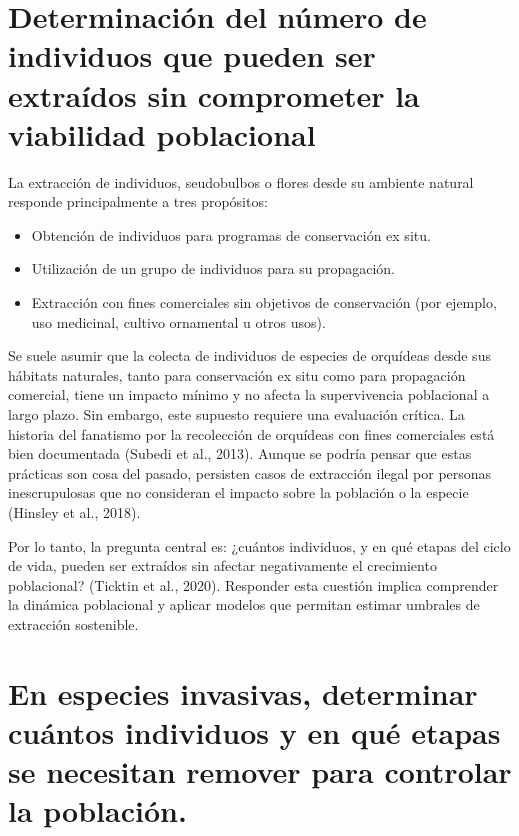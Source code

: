 \documentclass[
  12pt,
  letterpaper,
]{book}
\providecommand{\tightlist}{%
  \setlength{\itemsep}{0pt}\setlength{\parskip}{0pt}}\usepackage{longtable,booktabs,array}
\begin{document}
\section{Determinación del número de individuos que pueden ser extraídos
sin comprometer la viabilidad
poblacional}\label{determinaciuxf3n-del-nuxfamero-de-individuos-que-pueden-ser-extrauxeddos-sin-comprometer-la-viabilidad-poblacional}

La extracción de individuos, seudobulbos o flores desde su ambiente
natural responde principalmente a tres propósitos:

\begin{itemize}
\tightlist
\item
  Obtención de individuos para programas de conservación ex situ.
\item
  Utilización de un grupo de individuos para su propagación.
\item
  Extracción con fines comerciales sin objetivos de conservación (por
  ejemplo, uso medicinal, cultivo ornamental u otros usos).
\end{itemize}

Se suele asumir que la colecta de individuos de especies de orquídeas
desde sus hábitats naturales, tanto para conservación ex situ como para
propagación comercial, tiene un impacto mínimo y no afecta la
supervivencia poblacional a largo plazo. Sin embargo, este supuesto
requiere una evaluación crítica. La historia del fanatismo por la
recolección de orquídeas con fines comerciales está bien documentada
(Subedi et al., 2013). Aunque se podría pensar que estas prácticas son
cosa del pasado, persisten casos de extracción ilegal por personas
inescrupulosas que no consideran el impacto sobre la población o la
especie (Hinsley et al., 2018).

Por lo tanto, la pregunta central es: ¿cuántos individuos, y en qué
etapas del ciclo de vida, pueden ser extraídos sin afectar negativamente
el crecimiento poblacional? (Ticktin et al., 2020). Responder esta
cuestión implica comprender la dinámica poblacional y aplicar modelos
que permitan estimar umbrales de extracción sostenible.

\section{En especies invasivas, determinar cuántos individuos y en qué
etapas se necesitan remover para controlar la
población.}\label{en-especies-invasivas-determinar-cuuxe1ntos-individuos-y-en-quuxe9-etapas-se-necesitan-remover-para-controlar-la-poblaciuxf3n.}
\end{document}
